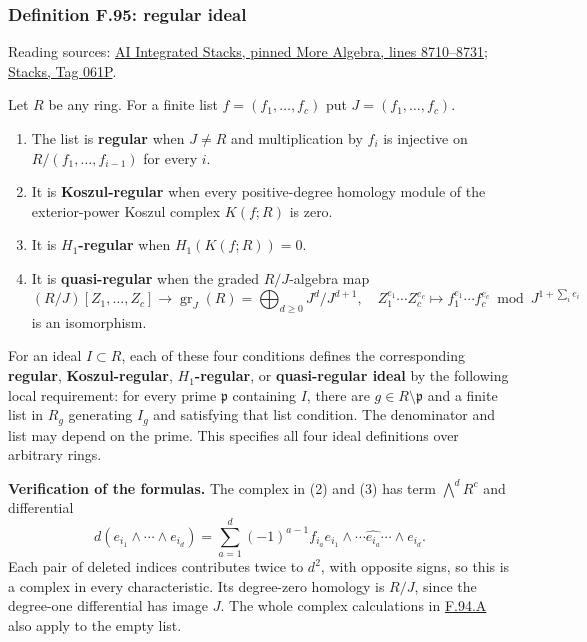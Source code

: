 \documentclass[11pt,a4paper,openany]{report}
\providecommand{\tightlist}{\setlength{\itemsep}{0pt}\setlength{\parskip}{0pt}}
\begin{document}
\label{AG-RG-S05-more-algebra-definition-regular-ideal}

\subsubsection{Definition F.95: regular ideal}\label{AG-RG-S05-definition-f.95-regular-ideal}

Reading sources: \href{https://github.com/KokunoYumeto/unofficial-stacks-project-ai-drafts/blob/565b10e987aba5969b21145a0833f42d69f96790/more-algebra.tex\#L8710-L8731}{AI Integrated Stacks, pinned More Algebra, lines 8710--8731}; \href{https://stacks.math.columbia.edu/tag/061P}{Stacks, Tag 061P}.

Let \(R\) be any ring. For a finite list \(f=(f_1,\ldots,f_c)\) put \(J=(f_1,\ldots,f_c)\).

\begin{enumerate}
\def\labelenumi{\arabic{enumi}.}
\tightlist
\item
  The list is \textbf{regular} when \(J\ne R\) and multiplication by \(f_i\) is injective on \(R/(f_1,\ldots,f_{i-1})\) for every \(i\).
\item
  It is \textbf{Koszul-regular} when every positive-degree homology module of the exterior-power Koszul complex \(K(f;R)\) is zero.
\item
  It is \textbf{\(H_1\)-regular} when \(H_1(K(f;R))=0\).
\item
  It is \textbf{quasi-regular} when the graded \(R/J\)-algebra map \[
  (R/J)[Z_1,\ldots,Z_c]\longrightarrow
  \operatorname{gr}_J(R)=\bigoplus_{d\ge0}J^d/J^{d+1},
  \quad
  Z_1^{e_1}\cdots Z_c^{e_c}\longmapsto
  f_1^{e_1}\cdots f_c^{e_c}\bmod J^{1+\sum_i e_i}
  \] is an isomorphism.
\end{enumerate}

For an ideal \(I\subset R\), each of these four conditions defines the corresponding \textbf{regular}, \textbf{Koszul-regular}, \textbf{\(H_1\)-regular}, or \textbf{quasi-regular ideal} by the following local requirement: for every prime \(\mathfrak p\) containing \(I\), there are \(g\in R\setminus\mathfrak p\) and a finite list in \(R_g\) generating \(I_g\) and satisfying that list condition. The denominator and list may depend on the prime. This specifies all four ideal definitions over arbitrary rings.

\textbf{Verification of the formulas.} The complex in (2) and (3) has term \(\bigwedge^dR^c\) and differential \[
d(e_{i_1}\wedge\cdots\wedge e_{i_d})
=\sum_{a=1}^d(-1)^{a-1}f_{i_a}
e_{i_1}\wedge\cdots\widehat{e_{i_a}}\cdots\wedge e_{i_d}.
\] Each pair of deleted indices contributes twice to \(d^2\), with opposite signs, so this is a complex in every characteristic. Its degree-zero homology is \(R/J\), since the degree-one differential has image \(J\). The whole complex calculations in \hyperref[AG-RG-S05-more-algebra-lemma-lci-presentation-independent]{F.94.A} also apply to the empty list.
\end{document}
